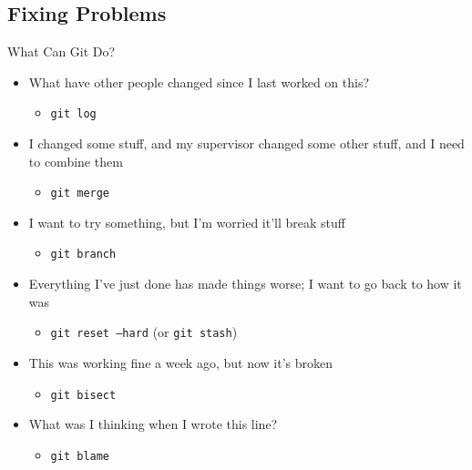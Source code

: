 \subsection{Fixing Problems}

\begin{frame}{What Can Git Do?}
	\begin{itemize}
		\item What have other people changed since I last worked on this?
		\begin{itemize}
			\item \texttt{git log}
		\end{itemize}
		\item I changed some stuff, and my supervisor changed some other stuff, and I need to combine them
		\begin{itemize}
			\item \texttt{git merge}
		\end{itemize}
		\item I want to try something, but I'm worried it'll break stuff
		\begin{itemize}
			\item \texttt{git branch}
		\end{itemize}
		\item Everything I've just done has made things worse; I want to go back to how it was
		\begin{itemize}
			\item \texttt{git reset --hard} (or \texttt{git stash})
		\end{itemize}
		\item This was working fine a week ago, but now it's broken
		\begin{itemize}
			\item \texttt{git bisect}
		\end{itemize}
		\item What was I thinking when I wrote this line?
		\begin{itemize}
			\item \texttt{git blame}
		\end{itemize}
	\end{itemize}
	
\end{frame}

